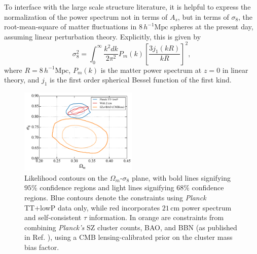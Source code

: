 \documentclass[twocolumn,aps,prd,nofootinbib,showpacs]{revtex4-1}
\begin{document}
To interface with the large scale structure literature, it is helpful to express the normalization of the power spectrum not in terms of $A_s$, but in terms of $\sigma_8$, the root-mean-square of matter fluctuations in $8\,h^{-1}\textrm{Mpc}$ spheres at the present day, assuming linear perturbation theory. Explicitly, this is given by
\begin{equation}
\sigma_8^2 = \int_0^\infty \frac{k^2 dk}{2 \pi^2} P_m (k) \left[ \frac{3 j_1 (kR)}{kR}\right]^2,
\end{equation}
where $R= 8\,h^{-1}\textrm{Mpc}$, $P_m(k)$ is the matter power spectrum at $z=0$ in linear theory, and $j_1$ is the first order spherical Bessel function of the first kind.

\begin{figure}[!]
\centering
\includegraphics[width=0.5\textwidth]{figures/omegamsigma8.pdf}
\caption{Likelihood contours on the $\Omega_m$-$\sigma_8$ plane, with bold lines signifying $95\%$ confidence regions and light lines signifying $68\%$ confidence regions. Blue contours denote the constraints using \emph{Planck} TT+lowP data only, while red incorporates $21\,\textrm{cm}$ power spectrum and self-consistent $\tau$ information. In orange are constraints from combining \emph{Planck's} SZ cluster counts, BAO, and BBN (as published in Ref. \cite{Planck2015clusters}), using a CMB lensing-calibrated prior on the cluster mass bias factor.}
\label{fig:omegamsigma8}
\end{figure}
\end{document}
